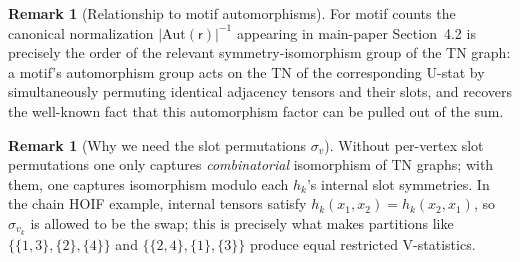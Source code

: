 \documentclass[11pt]{article}
\newcommand{\Aut}{\mathrm{Aut}}
\newcommand{\sfr}{\mathsf{r}}
\theoremstyle{plain}
\theoremstyle{definition}
\newtheorem{remark}[theorem]{Remark}
\begin{document}
\begin{remark}[Relationship to motif automorphisms]
For motif counts the canonical normalization $|{\Aut}(\sfr)|^{-1}$ appearing
in main-paper Section~4.2 is precisely the order of the relevant
symmetry-isomorphism group of the TN graph: a motif's automorphism group
acts on the TN of the corresponding U-stat by simultaneously permuting
identical adjacency tensors and their slots, and 
recovers the well-known fact that this automorphism factor can be pulled
out of the sum.
\end{remark}

\begin{remark}[Why we need the slot permutations $\sigma_v$]
Without per-vertex slot permutations one only captures \emph{combinatorial}
isomorphism of TN graphs; with them, one captures isomorphism modulo each
$h_k$'s internal slot symmetries.  In the chain HOIF example, internal
tensors satisfy $h_k(x_1,x_2)=h_k(x_2,x_1)$, so $\sigma_{v_k}$ is allowed
to be the swap; this is precisely what makes partitions like
$\{\{1,3\},\{2\},\{4\}\}$ and $\{\{2,4\},\{1\},\{3\}\}$ produce equal
restricted V-statistics.
\end{remark}
\end{document}
